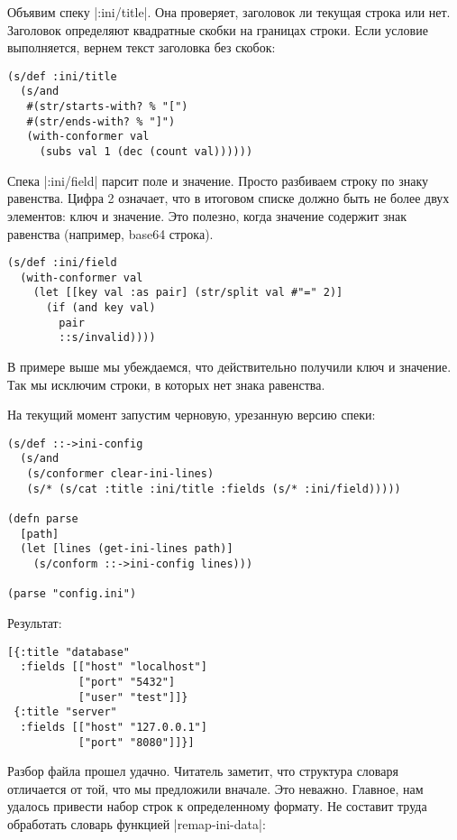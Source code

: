 Объявим спеку \spverb|:ini/title|. Она проверяет, заголовок ли текущая строка или
нет. Заголовок определяют квадратные скобки на границах строки. Если условие
выполняется, вернем текст заголовка без скобок:

\begin{verbatim}
(s/def :ini/title
  (s/and
   #(str/starts-with? % "[")
   #(str/ends-with? % "]")
   (with-conformer val
     (subs val 1 (dec (count val))))))
\end{verbatim}

Спека \spverb|:ini/field| парсит поле и значение. Просто разбиваем строку по знаку
равенства. Цифра 2 означает, что в итоговом списке должно быть не более двух
элементов: ключ и значение. Это полезно, когда значение содержит знак равенства
(например, base64 строка).

\begin{verbatim}
(s/def :ini/field
  (with-conformer val
    (let [[key val :as pair] (str/split val #"=" 2)]
      (if (and key val)
        pair
        ::s/invalid))))
\end{verbatim}

В примере выше мы убеждаемся, что действительно получили ключ и значение. Так мы
исключим строки, в которых нет знака равенства.

На текущий момент запустим черновую, урезанную версию спеки:

\begin{verbatim}
(s/def ::->ini-config
  (s/and
   (s/conformer clear-ini-lines)
   (s/* (s/cat :title :ini/title :fields (s/* :ini/field)))))

(defn parse
  [path]
  (let [lines (get-ini-lines path)]
    (s/conform ::->ini-config lines)))

(parse "config.ini")
\end{verbatim}

Результат:

\begin{verbatim}
[{:title "database"
  :fields [["host" "localhost"]
           ["port" "5432"]
           ["user" "test"]]}
 {:title "server"
  :fields [["host" "127.0.0.1"]
           ["port" "8080"]]}]
\end{verbatim}

Разбор файла прошел удачно. Читатель заметит, что структура словаря отличается
от той, что мы предложили вначале. Это неважно. Главное, нам удалось привести
набор строк к определенному формату. Не составит труда обработать словарь
функцией \spverb|remap-ini-data|:

